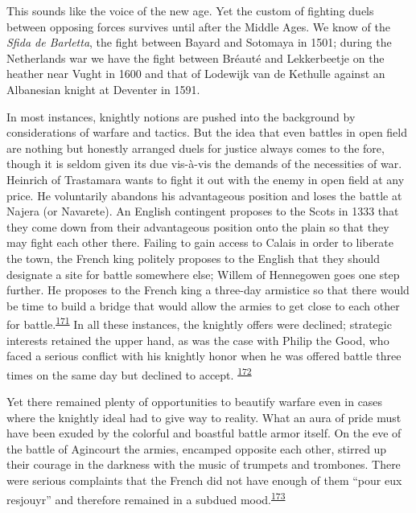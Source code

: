 This sounds like the voice of the new age. Yet the custom of fighting
duels between opposing forces survives until after the Middle Ages. We
know of the \emph{Sfida de Barletta}, the fight between Bayard and
Sotomaya in 1501; during the Netherlands war we have the fight between
Bréauté and Lekkerbeetje on the heather near Vught in 1600 and that of
Lodewijk van de Kethulle against an Albanesian knight at Deventer in
1591.

In most instances, knightly notions are pushed into the background by
considerations of warfare and tactics. But the idea that even battles in
open field are nothing but honestly arranged duels for justice always
comes to the fore, though it is seldom given its due vis-à-vis the
demands of the necessities of war. Heinrich of Trastamara wants to fight
it out with the enemy in open field at any price. He voluntarily
abandons his advantageous position and loses the battle at Najera (or
Navarete). An English contingent proposes to the Scots in 1333 that they
come down from their advantageous position onto the plain so that they
may fight each other there. Failing to gain access to Calais in order to
liberate the town, the French king politely proposes to the English that
they should designate a site for battle somewhere else; Willem of
Hennegowen goes one step further. He proposes to the French king a
three-day armistice so that there would be time to build a bridge that
would allow the armies to get close to each other for
battle.\textsuperscript{\protect\hypertarget{10_Chapter_Three__THE_HEROIC_DREAM.xhtmlux5cux23id_1594}{\protect\hyperlink{23_NOTES.xhtmlux5cux23id_1595}{171}}}
In all these instances, the knightly offers were declined; strategic
interests retained the upper hand, as was the case with Philip the Good,
who faced a serious conflict with his knightly honor when he was offered
battle three times on the same day but declined to accept.
\textsuperscript{\protect\hypertarget{10_Chapter_Three__THE_HEROIC_DREAM.xhtmlux5cux23id_1592}{\protect\hyperlink{23_NOTES.xhtmlux5cux23id_1593}{172}}}

Yet there remained plenty of opportunities to beautify warfare even in
cases where the knightly ideal had to give way to reality. What an aura
of pride must have been exuded by the colorful and boastful battle armor
itself. On the eve of the battle of Agincourt
\protect\hypertarget{10_Chapter_Three__THE_HEROIC_DREAM.xhtmlux5cux23page_114}{}{}the
armies, encamped opposite each other, stirred up their courage in the
darkness with the music of trumpets and trombones. There were serious
complaints that the French did not have enough of them ``pour eux
resjouyr'' and therefore remained in a subdued
mood.\textsuperscript{\protect\hypertarget{10_Chapter_Three__THE_HEROIC_DREAM.xhtmlux5cux23id_1590}{\protect\hyperlink{23_NOTES.xhtmlux5cux23id_1591}{173}}}

